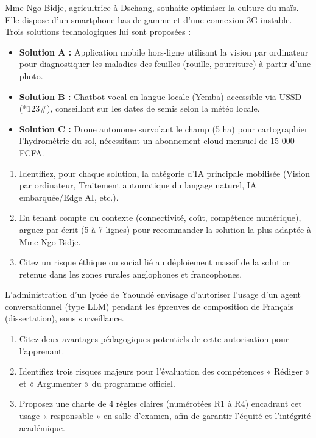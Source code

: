 \documentclass[11pt]{article}
\begin{document}
\begin{exercice}
Mme Ngo Bidje, agricultrice à Dschang, souhaite optimiser la culture du maïs. Elle dispose d'un smartphone bas de gamme et d'une connexion 3G instable. Trois solutions technologiques lui sont proposées :

\begin{itemize}
    \item \textbf{Solution A :} Application mobile hors-ligne utilisant la vision par ordinateur pour diagnostiquer les maladies des feuilles (rouille, pourriture) à partir d'une photo.
    \item \textbf{Solution B :} Chatbot vocal en langue locale (Yemba) accessible via USSD (*123\#), conseillant sur les dates de semis selon la météo locale.
    \item \textbf{Solution C :} Drone autonome survolant le champ (5 ha) pour cartographier l'hydrométrie du sol, nécessitant un abonnement cloud mensuel de 15 000 FCFA.
\end{itemize}

\begin{enumerate}
    \item Identifiez, pour chaque solution, la catégorie d'IA principale mobilisée (Vision par ordinateur, Traitement automatique du langage naturel, IA embarquée/Edge AI, etc.).
    \item En tenant compte du contexte (connectivité, coût, compétence numérique), arguez par écrit (5 à 7 lignes) pour recommander la solution la plus adaptée à Mme Ngo Bidje.
    \item Citez un risque éthique ou social lié au déploiement massif de la solution retenue dans les zones rurales anglophones et francophones.
\end{enumerate}
\end{exercice}

\begin{exercice}
L'administration d'un lycée de Yaoundé envisage d'autoriser l'usage d'un agent conversationnel (type LLM) pendant les épreuves de composition de Français (dissertation), sous surveillance.

\begin{enumerate}
    \item Citez deux avantages pédagogiques potentiels de cette autorisation pour l'apprenant.
    \item Identifiez trois risques majeurs pour l'évaluation des compétences « Rédiger » et « Argumenter » du programme officiel.
    \item Proposez une charte de 4 règles claires (numérotées R1 à R4) encadrant cet usage « responsable » en salle d'examen, afin de garantir l'équité et l'intégrité académique.
\end{enumerate}
\end{exercice}
\end{document}
